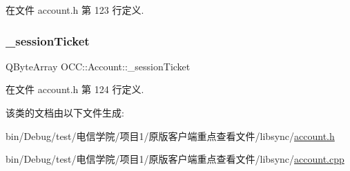 在文件 account.\+h 第 123 行定义.

\mbox{\label{class_o_c_c_1_1_account_a017f80dfc356869ad38f036ed726811e}} 
\subsubsection{\texorpdfstring{\+\_\+session\+Ticket}{\_sessionTicket}}
{\footnotesize\ttfamily Q\+Byte\+Array O\+C\+C\+::\+Account\+::\+\_\+session\+Ticket}



在文件 account.\+h 第 124 行定义.



该类的文档由以下文件生成\+:\begin{DoxyCompactItemize}
\item 
bin/\+Debug/test/电信学院/项目1/原版客户端重点查看文件/libsync/\hyperlink{account_8h}{account.\+h}\item 
bin/\+Debug/test/电信学院/项目1/原版客户端重点查看文件/libsync/\hyperlink{account_8cpp}{account.\+cpp}\end{DoxyCompactItemize}
